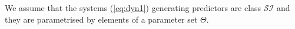 \documentclass{ifacconf}
\def\eqref#1{(\ref{#1})}
\def\rve{{\mathbf{e}}}
\def\rvq{{\mathbf{q}}}
\def\rvs{{\mathbf{s}}}
\def\rvv{{\mathbf{v}}}
\def\rvw{{\mathbf{w}}}
\def\rvy{{\mathbf{y}}}
\newtheorem{Assumption}{Assumption}[section]
\newcommand{\class}{\(\mathcal{SI}\)}
\begin{document}
We assume that the systems \eqref{eq:dyn1} generating predictors are class \class{}
and they are parametrised by elements of a parameter set $\Theta$.
\end{document}
